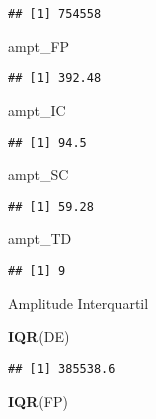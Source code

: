 \documentclass[]{article}
\newenvironment{Shaded}{\begin{snugshade}}{\end{snugshade}}
\newcommand{\KeywordTok}[1]{\textcolor[rgb]{0.13,0.29,0.53}{\textbf{#1}}}
\newcommand{\NormalTok}[1]{#1}
\begin{document}
\begin{verbatim}
## [1] 754558
\end{verbatim}

\begin{Shaded}
\begin{Highlighting}[]
\NormalTok{ampt_FP}
\end{Highlighting}
\end{Shaded}

\begin{verbatim}
## [1] 392.48
\end{verbatim}

\begin{Shaded}
\begin{Highlighting}[]
\NormalTok{ampt_IC}
\end{Highlighting}
\end{Shaded}

\begin{verbatim}
## [1] 94.5
\end{verbatim}

\begin{Shaded}
\begin{Highlighting}[]
\NormalTok{ampt_SC}
\end{Highlighting}
\end{Shaded}

\begin{verbatim}
## [1] 59.28
\end{verbatim}

\begin{Shaded}
\begin{Highlighting}[]
\NormalTok{ampt_TD}
\end{Highlighting}
\end{Shaded}

\begin{verbatim}
## [1] 9
\end{verbatim}

Amplitude Interquartil

\begin{Shaded}
\begin{Highlighting}[]
\KeywordTok{IQR}\NormalTok{(DE)}
\end{Highlighting}
\end{Shaded}

\begin{verbatim}
## [1] 385538.6
\end{verbatim}

\begin{Shaded}
\begin{Highlighting}[]
\KeywordTok{IQR}\NormalTok{(FP)}
\end{Highlighting}
\end{Shaded}
\end{document}
